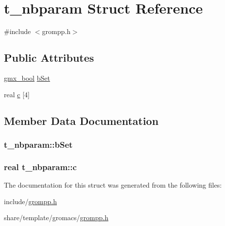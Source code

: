 \hypertarget{structt__nbparam}{\section{t\-\_\-nbparam \-Struct \-Reference}
\label{structt__nbparam}
}


{\ttfamily \#include $<$grompp.\-h$>$}

\subsection*{\-Public \-Attributes}
\begin{DoxyCompactItemize}
\item 
\hyperlink{include_2types_2simple_8h_a8fddad319f226e856400d190198d5151}{gmx\-\_\-bool} \hyperlink{structt__nbparam_a88cd4fff0a920fba879f84e724af0cbc}{b\-Set}
\item 
real \hyperlink{structt__nbparam_adeb1483896088505250d1c19d63482f6}{c} \mbox{[}4\mbox{]}
\end{DoxyCompactItemize}


\subsection{\-Member \-Data \-Documentation}
\hypertarget{structt__nbparam_a88cd4fff0a920fba879f84e724af0cbc}{
\subsubsection[{b\-Set}]{ {\bf t\-\_\-nbparam\-::b\-Set}}}\label{structt__nbparam_a88cd4fff0a920fba879f84e724af0cbc}
\hypertarget{structt__nbparam_adeb1483896088505250d1c19d63482f6}{
\subsubsection[{c}]{\setlength{\rightskip}{0pt plus 5cm}real {\bf t\-\_\-nbparam\-::c}}}\label{structt__nbparam_adeb1483896088505250d1c19d63482f6}


\-The documentation for this struct was generated from the following files\-:\begin{DoxyCompactItemize}
\item 
include/\hyperlink{include_2grompp_8h}{grompp.\-h}\item 
share/template/gromacs/\hyperlink{share_2template_2gromacs_2grompp_8h}{grompp.\-h}\end{DoxyCompactItemize}
